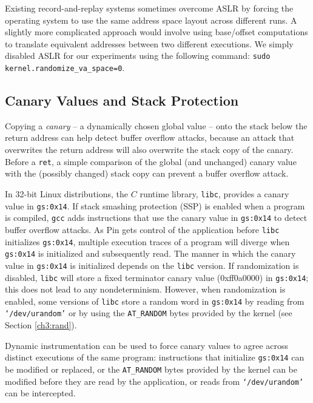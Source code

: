 Existing record-and-replay systems sometimes overcome ASLR by
forcing the operating system to use the same address space layout across
different runs. A slightly more complicated approach would involve
using base/offset computations to translate equivalent 
addresses between two different executions. 
We simply disabled ASLR for our experiments using the following command:
\texttt {sudo kernel.randomize\_va\_space=0}.

\subsection{Canary Values and Stack Protection}
Copying a \emph{canary} -- a dynamically chosen global value -- onto the stack below the return
address can help detect buffer overflow attacks, because 
an attack that overwrites the return address will also overwrite
the stack copy of the canary. Before a \texttt{ret}, a simple comparison of the global (and unchanged) canary
value with the (possibly changed) stack copy can prevent a buffer overflow attack.

In 32-bit Linux distributions, the $C$ runtime library, 
\texttt{libc}, provides a canary value in \texttt{gs:0x14}.
If stack smashing protection (SSP) is enabled when a program is compiled,
\texttt{gcc} adds instructions that use the canary value
in \texttt{gs:0x14} to detect buffer overflow attacks.
As Pin gets control of the application before \texttt{libc}
initializes \texttt{gs:0x14}, multiple execution traces of a program
will diverge when \texttt{gs:0x14} is initialized and subsequently
read.  The manner in which the canary value in \texttt{gs:0x14} is initialized
depends on the \texttt{libc} version.
If randomization is disabled, \texttt{libc} will store a fixed terminator canary value (0xff0a0000)
in \texttt{gs:0x14}; this does not lead to any nondeterminism.
However, when randomization is enabled, 
some versions of \texttt{libc} store a random word in \texttt{gs:0x14} by reading from \texttt{`/dev/urandom'}
or by using the \texttt{AT\_RANDOM} bytes provided by the kernel (see Section \ref{ch3:rand}). 

Dynamic instrumentation can be used to force canary values
to agree across distinct executions of the same program:
instructions that initialize \texttt{gs:0x14} can be
modified or replaced, or the \texttt{AT\_RANDOM} bytes provided by the kernel can be
modified before they are read by the application, or reads from \texttt{`/dev/urandom'} can be 
intercepted.

